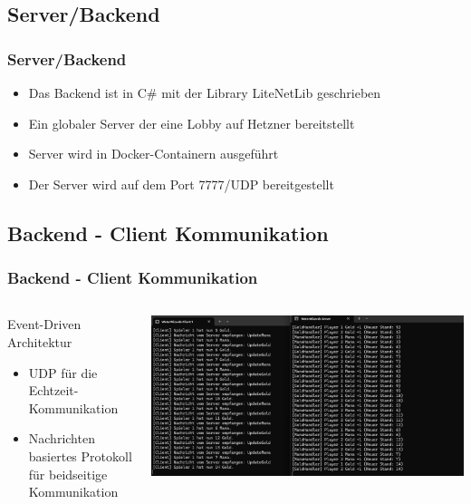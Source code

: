 \documentclass{beamer}
\begin{document}
\subsection{Server/Backend}
\begin{frame}
\frametitle{Server/Backend}
  \begin{itemize}
    \item Das Backend ist in C\# mit der Library LiteNetLib geschrieben
    \item Ein globaler Server der eine Lobby auf Hetzner bereitstellt
    \item Server wird in Docker-Containern ausgeführt
    \item Der Server wird auf dem Port 7777/UDP bereitgestellt
  \end{itemize}
\end{frame}

\subsection{Backend - Client Kommunikation}
\begin{frame}
\frametitle{Backend - Client Kommunikation}
\begin{columns}
  \begin{column}{0.45\textwidth}
    Event-Driven Architektur
    \begin{itemize}
      \item UDP für die Echtzeit-Kommunikation
      \item Nachrichten basiertes Protokoll für beidseitige Kommunikation
    \end{itemize}
  \end{column}
  \begin{column}{0.55\textwidth}
    \includegraphics[width=\textwidth]{Server-Client-Logs.png}
  \end{column}
\end{columns}
\end{frame}
\end{document}
